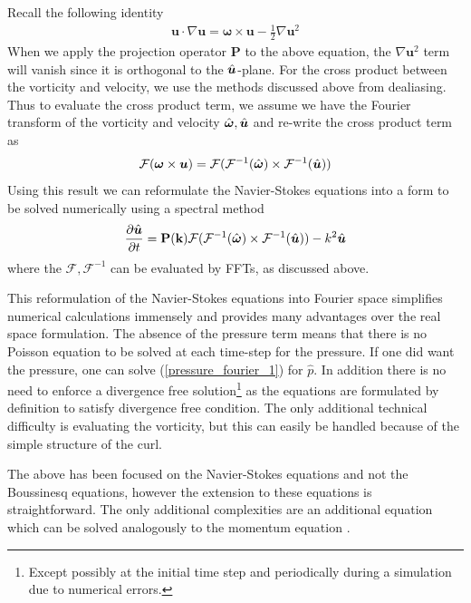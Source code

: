 Recall the following identity \cite{kundu,acheson_fluid}
\begin{align}
\bm{u}\cdot\nabla\bm{u} = \bm{\omega}\times \bm{u} - \frac{1}{2}\nabla \bm{u}^{2}
\end{align}
When we apply the projection operator $\textbf{P}$ to the above equation, the $\nabla \bm{u}^{2}$ term will vanish since it is orthogonal to the $\hat{\bm{u}}$-plane. For the cross product between the vorticity and velocity, we use the methods discussed above from dealiasing. Thus to evaluate the cross product term, we assume we have the Fourier transform of the vorticity and velocity $\hat{\bm{\omega}},\hat{\bm{u}}$ and re-write the cross product term as
\begin{align}
\mathcal{F}(\bm{\omega}\times \bm{u}) = \mathcal{F}(\mathcal{F}^{-1}(\hat{\bm{\omega}})\times\mathcal{F}^{-1}(\hat{\bm{u}}))
\end{align}
Using this result we can reformulate the Navier-Stokes equations into a form to be solved numerically using a spectral method
\begin{align}
\frac{\partial \hat{\bm{u}}}{\partial t} = \textbf{P}(\textbf{k})\mathcal{F}(\mathcal{F}^{-1}(\hat{\bm{\omega}})\times\mathcal{F}^{-1}(\hat{\bm{u}}))-k^{2}\hat{\bm{u}}
\end{align}
where the $\mathcal{F},\mathcal{F}^{-1}$ can be evaluated by FFTs, as discussed above.

This reformulation of the Navier-Stokes equations into Fourier space simplifies numerical calculations immensely and provides many advantages over the real space formulation. The absence of the pressure term means that there is no Poisson equation to be solved at each time-step for the pressure. If one did want the pressure, one can solve (\ref{pressure_fourier_1}) for $\hat{p}$. In addition there is no need to enforce a divergence free solution\footnote{Except possibly at the initial time step and periodically during a simulation due to numerical errors.} as the equations are formulated by definition to satisfy divergence free condition. The only additional technical difficulty is evaluating the vorticity, but this can easily be handled because of the simple structure of the curl. 

The above has been focused on the Navier-Stokes equations and not the Boussinesq equations, however the extension to these equations is straightforward. The only additional complexities are an additional equation which can be solved analogously to the momentum equation \cite{lesieur}.
